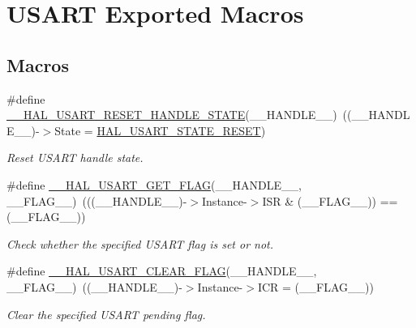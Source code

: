 \hypertarget{group___u_s_a_r_t___exported___macros}{}\section{U\+S\+A\+RT Exported Macros}
\label{group___u_s_a_r_t___exported___macros}
\subsection*{Macros}
\begin{DoxyCompactItemize}
\item 
\#define \hyperlink{group___u_s_a_r_t___exported___macros_ga953ddcf8e901974e9f73e7d337238170}{\+\_\+\+\_\+\+H\+A\+L\+\_\+\+U\+S\+A\+R\+T\+\_\+\+R\+E\+S\+E\+T\+\_\+\+H\+A\+N\+D\+L\+E\+\_\+\+S\+T\+A\+TE}(\+\_\+\+\_\+\+H\+A\+N\+D\+L\+E\+\_\+\+\_\+)~((\+\_\+\+\_\+\+H\+A\+N\+D\+L\+E\+\_\+\+\_\+)-\/$>$State = \hyperlink{group___u_s_a_r_t___exported___types_gga502e7abdfa6b24f0f6b40cf60c7383c5ab78adc4ded45529f2cf9e74150e49696}{H\+A\+L\+\_\+\+U\+S\+A\+R\+T\+\_\+\+S\+T\+A\+T\+E\+\_\+\+R\+E\+S\+ET})
\begin{DoxyCompactList}\small\item\em Reset U\+S\+A\+RT handle state. \end{DoxyCompactList}\item 
\#define \hyperlink{group___u_s_a_r_t___exported___macros_ga16b9a5a85a8edc0464db168c2db21b3a}{\+\_\+\+\_\+\+H\+A\+L\+\_\+\+U\+S\+A\+R\+T\+\_\+\+G\+E\+T\+\_\+\+F\+L\+AG}(\+\_\+\+\_\+\+H\+A\+N\+D\+L\+E\+\_\+\+\_\+,  \+\_\+\+\_\+\+F\+L\+A\+G\+\_\+\+\_\+)~(((\+\_\+\+\_\+\+H\+A\+N\+D\+L\+E\+\_\+\+\_\+)-\/$>$Instance-\/$>$I\+SR \& (\+\_\+\+\_\+\+F\+L\+A\+G\+\_\+\+\_\+)) == (\+\_\+\+\_\+\+F\+L\+A\+G\+\_\+\+\_\+))
\begin{DoxyCompactList}\small\item\em Check whether the specified U\+S\+A\+RT flag is set or not. \end{DoxyCompactList}\item 
\#define \hyperlink{group___u_s_a_r_t___exported___macros_gaff3cb6ff740b240764e7844eaf3d6807}{\+\_\+\+\_\+\+H\+A\+L\+\_\+\+U\+S\+A\+R\+T\+\_\+\+C\+L\+E\+A\+R\+\_\+\+F\+L\+AG}(\+\_\+\+\_\+\+H\+A\+N\+D\+L\+E\+\_\+\+\_\+,  \+\_\+\+\_\+\+F\+L\+A\+G\+\_\+\+\_\+)~((\+\_\+\+\_\+\+H\+A\+N\+D\+L\+E\+\_\+\+\_\+)-\/$>$Instance-\/$>$I\+CR = (\+\_\+\+\_\+\+F\+L\+A\+G\+\_\+\+\_\+))
\begin{DoxyCompactList}\small\item\em Clear the specified U\+S\+A\+RT pending flag. \end{DoxyCompactList}\item 

\end{DoxyCompactItemize}
